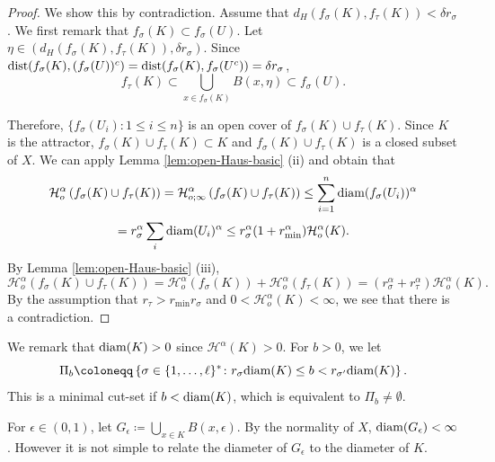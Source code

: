 \documentclass[a4paper, reqno, 11pt]{amsart}
\theoremstyle{definition}
\begin{document}
\begin{proof}
We show this by contradiction. 
Assume that $d_H (f_{\sigma}(K), f_{\tau}(K)) < \delta r_{\sigma}$. 
We first remark that $f_{\sigma}(K) \subset f_{\sigma}(U)$. 
Let $\eta \in (d_H (f_{\sigma}(K), f_{\tau}(K)), \delta r_{\sigma})$. 
Since $\textup{dist}(f_{\sigma}(K), (f_{\sigma}(U))^c) = \textup{dist}(f_{\sigma}(K), f_{\sigma}(U^c)) = \delta r_{\sigma}$, 
\[ f_{\tau}(K) \subset \bigcup_{x \in f_{\sigma}(K)} B(x,\eta) \subset f_{\sigma}(U).  \]




Therefore, $\{f_{\sigma}(U_i) \colon 1 \le i \le n\}$ is an open cover of $f_{\sigma}(K) \cup f_{\tau}(K)$. 
Since $K$ is the attractor, $f_{\sigma}(K) \cup f_{\tau}(K) \subset K$ and $f_{\sigma}(K) \cup f_{\tau}(K)$ is a closed subset of $X$. 
We can apply Lemma \ref{lem:open-Haus-basic} (ii) and obtain that 
\[ \mathcal{H}^{\alpha}_{o} \left(f_{\sigma}(K) \cup f_{\tau}(K) \right) = \mathcal{H}^{\alpha}_{o;\infty} \left(f_{\sigma}(K) \cup f_{\tau}(K) \right) \le \sum_{i=1}^{n} \textup{diam}(f_{\sigma}(U_i))^{\alpha} \]
\[ = r_{\sigma}^{\alpha} \sum_{i} \textup{diam}(U_i)^{\alpha} \le  r_{\sigma}^{\alpha}(1+r_{\min}^{\alpha})\mathcal{H}_{o}^{\alpha}(K). \]
By Lemma \ref{lem:open-Haus-basic} (iii), 
\[ \mathcal{H}^{\alpha}_{o} \left(f_{\sigma}(K) \cup f_{\tau}(K) \right) = \mathcal{H}^{\alpha}_{o} \left(f_{\sigma}(K) \right) + \mathcal{H}^{\alpha}_{o} \left(f_{\tau}(K) \right) =  (r_{\sigma}^{\alpha} +r_{\tau}^{\alpha})\mathcal{H}_{o}^{\alpha}(K). \]
By the assumption that $r_{\tau} > r_{\min} r_{\sigma}$ and $0 < \mathcal{H}^{\alpha}_{o}(K) < \infty$, 
we see that there is a contradiction. 
\end{proof}



We remark that $\textup{diam}(K) > 0$ since $\mathcal{H}^{\alpha}(K) > 0$. 
For $b > 0$, we let 
\begin{equation}\label{eq:def-cutset-2} 
\Pi_b \coloneqq \left\{\sigma \in \{1,\dots,\ell\}^{*} \colon r_{\sigma} \textup{diam}(K)  \le b < r_{\sigma^{\prime}} \textup{diam}(K)  \right\}. 
\end{equation}
This is a minimal cut-set if $b < \textup{diam}(K)$, which is equivalent to $\Pi_b \ne \emptyset$. 

For $\epsilon \in (0,1)$, let $G_{\epsilon} \coloneqq \bigcup_{x \in K} B(x,\epsilon)$. 
By the normality of $X$, $\textup{diam}(G_{\epsilon}) < \infty$. 
However it is not simple to relate the diameter of $G_{\epsilon}$ to the diameter of $K$. 
\end{document}

